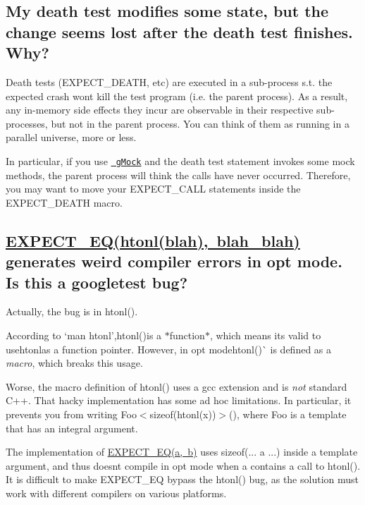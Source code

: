 \subsection*{My death test modifies some state, but the change seems lost after the death test finishes. Why?}

Death tests ({\ttfamily E\+X\+P\+E\+C\+T\+\_\+\+D\+E\+A\+TH}, etc) are executed in a sub-\/process s.\+t. the expected crash won\textquotesingle{}t kill the test program (i.\+e. the parent process). As a result, any in-\/memory side effects they incur are observable in their respective sub-\/processes, but not in the parent process. You can think of them as running in a parallel universe, more or less.

In particular, if you use \href{../../googlemock}{\texttt{ g\+Mock}} and the death test statement invokes some mock methods, the parent process will think the calls have never occurred. Therefore, you may want to move your {\ttfamily E\+X\+P\+E\+C\+T\+\_\+\+C\+A\+LL} statements inside the {\ttfamily E\+X\+P\+E\+C\+T\+\_\+\+D\+E\+A\+TH} macro.

\subsection*{\mbox{\hyperlink{gtest_8h_a4159019abda84f5366acdb7604ff220a}{E\+X\+P\+E\+C\+T\+\_\+\+E\+Q(htonl(blah), blah\+\_\+blah)}} generates weird compiler errors in opt mode. Is this a googletest bug?}

Actually, the bug is in {\ttfamily htonl()}.

According to `\textquotesingle{}man htonl'{\ttfamily ,}htonl(){\ttfamily is a $\ast$function$\ast$, which means it\textquotesingle{}s valid to use}htonl{\ttfamily as a function pointer. However, in opt mode}htonl()\`{} is defined as a {\itshape macro}, which breaks this usage.

Worse, the macro definition of {\ttfamily htonl()} uses a {\ttfamily gcc} extension and is {\itshape not} standard C++. That hacky implementation has some ad hoc limitations. In particular, it prevents you from writing {\ttfamily Foo$<$sizeof(htonl(x))$>$()}, where {\ttfamily Foo} is a template that has an integral argument.

The implementation of {\ttfamily \mbox{\hyperlink{gtest_8h_a4159019abda84f5366acdb7604ff220a}{E\+X\+P\+E\+C\+T\+\_\+\+E\+Q(a, b)}}} uses {\ttfamily sizeof(... a ...)} inside a template argument, and thus doesn\textquotesingle{}t compile in opt mode when {\ttfamily a} contains a call to {\ttfamily htonl()}. It is difficult to make {\ttfamily E\+X\+P\+E\+C\+T\+\_\+\+EQ} bypass the {\ttfamily htonl()} bug, as the solution must work with different compilers on various platforms.

